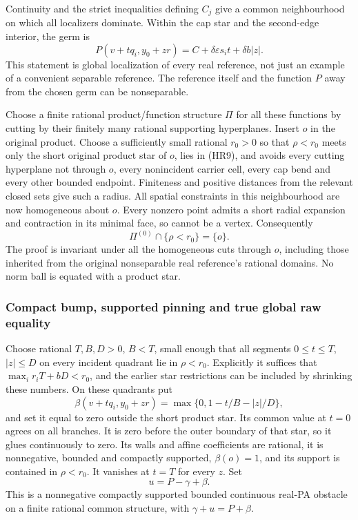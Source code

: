 \documentclass[
  11pt,
]{article}
\begin{document}
Continuity and the strict inequalities defining \(C_j\) give a common
neighbourhood on which all localizers dominate. Within the cap star and
the second-edge interior, the germ is \[
                 P(v+tq_i,y_0+zr)=C+\delta\varepsilon s_it
                                               +\delta b|z|. \tag{HR9}
\] This statement is global localization of every real reference, not
just an example of a convenient separable reference. The reference
itself and the function \(P\) away from the chosen germ can be
nonseparable.

Choose a finite rational product/function structure \(\Pi\) for all
these functions by cutting by their finitely many rational supporting
hyperplanes. Insert \(o\) in the original product. Choose a sufficiently
small rational \(r_0>0\) so that \(\rho<r_0\) meets only the short
original product star of \(o\), lies in (HR9), and avoids every cutting
hyperplane not through \(o\), every nonincident carrier cell, every cap
bend and every other bounded endpoint. Finiteness and positive distances
from the relevant closed sets give such a radius. All spatial
constraints in this neighbourhood are now homogeneous about \(o\). Every
nonzero point admits a short radial expansion and contraction in its
minimal face, so cannot be a vertex. Consequently \[
                   \Pi^{(0)}\cap\{\rho<r_0\}=\{o\}.        \tag{HR10}
\] The proof is invariant under all the homogeneous cuts through \(o\),
including those inherited from the original nonseparable real
reference's rational domains. No norm ball is equated with a product
star.

\subsubsection{Compact bump, supported pinning and true global raw
equality}\label{compact-bump-supported-pinning-and-true-global-raw-equality}

Choose rational \(T,B,D>0\), \(B<T\), small enough that all segments
\(0\leq t\leq T\), \(|z|\leq D\) on every incident quadrant lie in
\(\rho<r_0\). Explicitly it suffices that \(\max_i r_iT+bD<r_0\), and
the earlier star restrictions can be included by shrinking these
numbers. On these quadrants put \[
          \beta(v+tq_i,y_0+zr)
                    =\max\{0,1-t/B-|z|/D\},                \tag{HR11}
\] and set it equal to zero outside the short product star. Its common
value at \(t=0\) agrees on all branches. It is zero before the outer
boundary of that star, so it glues continuously to zero. Its walls and
affine coefficients are rational, it is nonnegative, bounded and
compactly supported, \(\beta(o)=1\), and its support is contained in
\(\rho<r_0\). It vanishes at \(t=T\) for every \(z\). Set \[
                        u=P-\gamma+\beta.                 \tag{HR12}
\] This is a nonnegative compactly supported bounded continuous real-PA
obstacle on a finite rational common structure, with
\(\gamma+u=P+\beta\).
\end{document}
